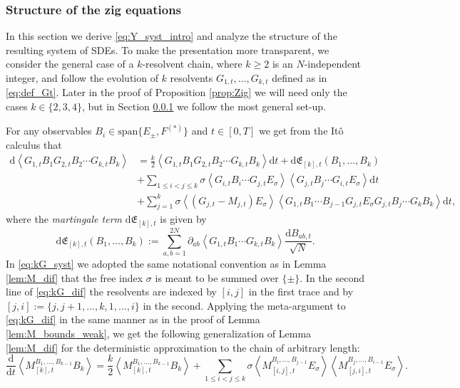 \documentclass[10pt]{amsart}
\numberwithin{equation}{section}
\newcommand{\dif}{\mathrm{d}}
\begin{document}
\subsubsection{Structure of the zig equations}\label{sec:Zig_structure}

In this section we derive \eqref{eq:Y_syst_intro} and analyze the structure of the resulting system of SDEs. To make the presentation more transparent, we consider the general case of a $k$-resolvent chain, where $k\ge 2$ is an $N$-independent integer, and follow the evolution of $k$ resolvents $G_{1,t},\ldots, G_{k,t}$ defined as in \eqref{eq:def_Gt}. Later in the proof of  Proposition \ref{prop:Zig} we will need only the cases $k\in\{2,3,4\}$, but in Section \ref{sec:Zig_structure} we follow the most general set-up.


For any observables $B_i\in \mathrm{span}\{E_\pm,F^{(*)}\}$ and $t\in [0,T]$ we get from the It\^{o} calculus that
\begin{equation}
\begin{split}
\dif \left\langle G_{1,t}B_1G_{2,t}B_2\cdots G_{k,t}B_k\right\rangle &= \frac{k}{2} \left\langle G_{1,t}B_1G_{2,t}B_2\cdots G_{k,t}B_k\right\rangle\dif t+\dif\mathfrak{E}_{[k],t}(B_1,\ldots,B_k)\\
& + \sum_{1\le i<j\le k} \sigma \left\langle G_{i,t}B_i\cdots G_{j,t}E_\sigma\right\rangle\left\langle G_{j,t}B_j\cdots G_{i,t} E_\sigma\right\rangle\dif t\\
&+ \sum_{j=1}^k \sigma \left\langle (G_{j,t}-M_{j,t})E_\sigma\right\rangle\left\langle G_{1,t}B_1\cdots B_{j-1}G_{j,t}E_\sigma G_{j,t} B_j\cdots G_kB_k\right\rangle\dif t,
\end{split}
\label{eq:kG_dif}
\end{equation}
where the \emph{martingale term} $\dif \mathfrak{E}_{[k],t}$ is given by
\begin{equation}
\dif\mathfrak{E}_{[k],t}(B_1,\ldots,B_k):= \sum_{a,b=1}^{2N}\partial_{ab}\left\langle G_{1,t}B_1\cdots G_{k,t}B_k\right\rangle \frac{\dif B_{ab,t}}{\sqrt{N}}.
\label{eq:def_E}
\end{equation}
In \eqref{eq:kG_syst} we adopted the same notational convention as in Lemma \ref{lem:M_dif} that the free index $\sigma$ is meant to be summed over $\{\pm\}$. In the second line of \eqref{eq:kG_dif} the resolvents are indexed by $[i,j]$ in the first trace and by $[j,i]:=\{j,j+1,\ldots,k,1,\ldots,i\}$ in the second. Applying the meta-argument to \eqref{eq:kG_dif} in the same manner as in the proof of Lemma \ref{lem:M_bounds_weak}, we get the following generalization of Lemma \ref{lem:M_dif} for the deterministic approximation to the chain of arbitrary length:
\begin{equation}
\frac{\dif}{\dif t} \left\langle M_{[k],t}^{B_1,\ldots,B_{k-1}}B_k\right\rangle = \frac{k}{2} \left\langle M_{[k],t}^{B_1,\ldots,B_{k-1}}B_k\right\rangle + \sum_{1\le i<j\le k} \sigma \left\langle M_{[i,j],t}^{B_i,\ldots,B_{j-1}}E_\sigma\right\rangle \left\langle M_{[j,i],t}^{B_j,\ldots,B_{i-1}}E_\sigma\right\rangle.
\label{eq:kM_dif}
\end{equation}
\end{document}
